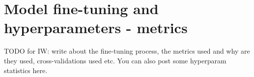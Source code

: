 
\section{Model fine-tuning and hyperparameters - metrics}

TODO for IW: write about the fine-tuning process, the metrics used and why are they used, cross-validations used etc. You can also post some hyperparam statistics here.